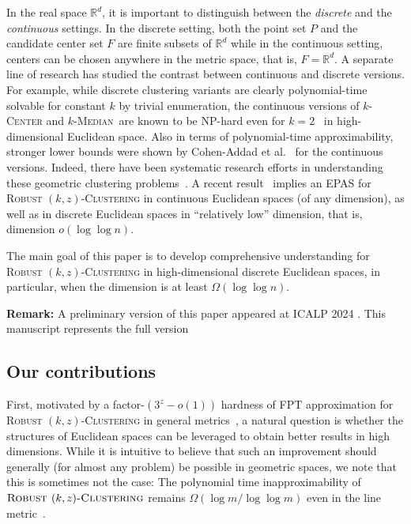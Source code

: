 \documentclass[11pt]{article}
\newcommand{\kc}{\textsc{$k$-Center}\xspace}
\newcommand{\fpt}{\textsf{FPT}\xspace}
\newcommand{\rkc}{\textsc{Robust $(k,z)$-Clustering}\xspace}
\newcommand{\bRd}{\ensuremath{\mathbb{R}^d}\xspace}
\newcommand{\kmd}{\textsc{$k$-Median}}
\begin{document}
In the real space $\bRd$, it is important to distinguish between the \emph{discrete} and the \emph{continuous} settings. In the discrete setting, both the point set $P$ and the candidate center set $F$ are finite subsets of ${\mathbb R}^d$ while in the continuous setting, centers can be chosen anywhere in the metric space, that is, $F = {\mathbb R}^d$. A separate line of research has studied the contrast between continuous and discrete versions. For example, while discrete clustering variants are clearly polynomial-time solvable for constant $k$ by trivial enumeration, the continuous versions of \kc and \kmd~are known to be NP-hard even for $k=2$~\cite{drineas-etal04:np-hardness-2-means-highdim} in high-dimensional Euclidean space. Also in terms of polynomial-time approximability, stronger lower bounds were shown by Cohen-Addad et al.~\cite{cohen2021approximability} for the continuous versions. Indeed, there have been systematic research efforts in understanding these geometric clustering problems~\cite{cohen2022johnson,cohen2019inapproximability,cohen2021approximability}.
A recent result~\cite{abbasi-etal23:epas-norm-clustering} implies an EPAS for \rkc in continuous Euclidean spaces (of any dimension), as well as in discrete Euclidean spaces in ``relatively low'' dimension, that is, dimension $o(\log \log n)$. 

The main goal of this paper is to develop comprehensive understanding for \rkc in high-dimensional discrete Euclidean spaces, in particular, when the dimension is at least $\Omega(\log \log n)$.


\bigskip
\noindent\textbf{Remark:} A preliminary version of this paper appeared at ICALP 2024 \cite{Icalpabbasi}. This manuscript represents the full version

\subsection{Our contributions}


First, motivated by a factor-$(3^z-o(1))$ hardness of \fpt approximation for \rkc in general metrics~\cite{goyal2021tight}, a natural question is whether the structures of Euclidean spaces can be leveraged to obtain better results in high dimensions. 
While it is intuitive to believe that such an improvement should generally (for almost any problem) be possible in geometric spaces, we note that this is sometimes not the case: The polynomial time inapproximability of $\rkc$ remains $\Omega(\log m/ \log \log m)$ even in the line metric~\cite{bhattacharya2014new}. 
\end{document}
